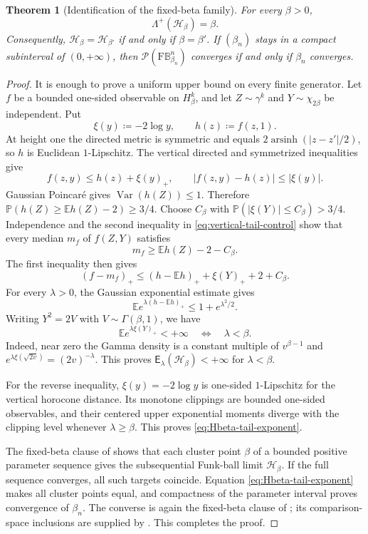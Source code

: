 \documentclass{amsart}
\numberwithin{equation}{section}
\theoremstyle{plain}
\newtheorem{theorem}{Theorem}[section]
\theoremstyle{definition}
\theoremstyle{remark}
\newcommand{\BetaBall}{\mathrm F\mathbb B^n_{\beta_n}}
\newcommand{\Pyr}{\mathcal P}
\newcommand{\Var}{\operatorname{Var}}
\DeclareMathOperator{\arsinh}{arsinh}
\begin{document}
\begin{theorem}[Identification of the fixed-beta family]\label{thm:Hbeta-classification}
For every $\beta>0$,
\begin{equation}\label{eq:Hbeta-tail-exponent} \Lambda^+(\mathcal H_\beta)=\beta. \end{equation}
Consequently, $\mathcal H_\beta=\mathcal H_{\beta'}$ if and only if $\beta=\beta'$.  If $(\beta_n)$ stays in a compact subinterval of $(0,+\infty)$, then $\Pyr(\BetaBall)$ converges if and only if $\beta_n$ converges.
\end{theorem}

\begin{proof}
It is enough to prove a uniform upper bound on every finite generator.  Let $f$ be a bounded one-sided observable on $H_\beta^k$, and let $Z\sim\gamma^k$ and $Y\sim\chi_{2\beta}$ be independent.  Put
\[ \xi(y)\coloneqq-2\log y, \qquad h(z)\coloneqq f(z,1). \]
At height one the directed metric is symmetric and equals $2\arsinh(|z-z'|/2)$, so $h$ is Euclidean $1$-Lipschitz.  The vertical directed and symmetrized inequalities give
\begin{equation}\label{eq:vertical-tail-control} f(z,y)\le h(z)+\xi(y)_+, \qquad |f(z,y)-h(z)|\le|\xi(y)|. \end{equation}
Gaussian Poincar\'e gives $\Var(h(Z))\le1$.  Therefore
$\mathbb P(h(Z)\ge\mathbb Eh(Z)-2)\ge3/4$.  Choose $C_\beta$ with $\mathbb P(|\xi(Y)|\le C_\beta)>3/4$.  Independence and the second inequality in \eqref{eq:vertical-tail-control} show that every median $m_f$ of $f(Z,Y)$ satisfies
\[ m_f\ge\mathbb Eh(Z)-2-C_\beta. \]
The first inequality then gives
\[ (f-m_f)_+ \le(h-\mathbb Eh)_++\xi(Y)_++2+C_\beta. \]
For every $\lambda>0$, the Gaussian exponential estimate gives
\[ \mathbb E e^{\lambda(h-\mathbb Eh)_+} \le1+e^{\lambda^2/2}. \]
Writing $Y^2=2V$ with $V\sim\Gamma(\beta,1)$, we have
\[ \mathbb E e^{\lambda\xi(Y)_+}<+\infty \quad\Longleftrightarrow\quad\lambda<\beta. \]
Indeed, near zero the Gamma density is a constant multiple of $v^{\beta-1}$ and $e^{\lambda\xi(\sqrt{2v})}=(2v)^{-\lambda}$.  This proves $\mathsf E_\lambda(\mathcal H_\beta)<+\infty$ for $\lambda<\beta$.

For the reverse inequality, $\xi(y)=-2\log y$ is one-sided $1$-Lipschitz for the vertical horocone distance.  Its monotone clippings are bounded one-sided observables, and their centered upper exponential moments diverge with the clipping level whenever $\lambda\ge\beta$.  This proves \eqref{eq:Hbeta-tail-exponent}.

The fixed-beta clause of  shows that each cluster point $\beta$ of a bounded positive parameter sequence gives the subsequential Funk-ball limit $\mathcal H_\beta$.  If the full sequence converges, all such targets coincide.  Equation \eqref{eq:Hbeta-tail-exponent} makes all cluster points equal, and compactness of the parameter interval proves convergence of $\beta_n$.  The converse is again the fixed-beta clause of ; its comparison-space inclusions are supplied by .  This completes the proof.
\end{proof}
\end{document}
